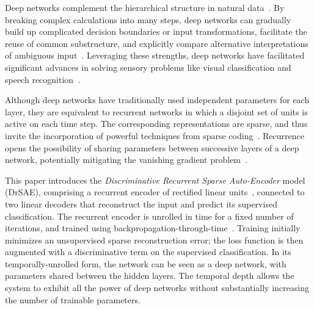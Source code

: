 \documentclass{article} %
\begin{document}
Deep networks complement the hierarchical structure in natural data~\citep{bengio2009}.  
By breaking complex calculations into many steps, deep networks can gradually build up complicated decision boundaries or input transformations, facilitate the reuse of common substructure, and explicitly compare alternative interpretations of ambiguous input~\citep{lee2008, zeiler2011}.  
Leveraging these strengths, deep networks have facilitated significant advances in solving sensory problems like visual classification and speech recognition~\citep{hinton2006, dahl2012, hinton2012}.  

Although deep networks have traditionally used independent parameters for each layer, they are equivalent to recurrent networks in which a disjoint set of units is active on each time step.  
The corresponding representations are sparse, and thus invite the incorporation of powerful techniques from sparse coding~\citep{olshausen1996, olshausen1997, ranzato2006, lee2008, glorot2011}.
Recurrence opens the possibility of sharing parameters between successive layers of a deep network, potentially mitigating the vanishing gradient problem~\citep{bengio1994}.

This paper introduces the \emph{Discriminative Recurrent Sparse Auto-Encoder} model (DrSAE), comprising a recurrent encoder of rectified linear units~\citep[ReLU; ][]{salinas1996, jarrett2009, nair2010, glorot2011}, connected to two linear decoders that reconstruct the input and predict its supervised classification.  The recurrent encoder is unrolled in time for a fixed number of iterations, and trained using backpropagation-through-time~\citep{rumelhart1986}.  Training initially minimizes an unsupervised sparse reconstruction error; the loss function is then augmented with a discriminative term on the supervised classification.  
In its temporally-unrolled form, the network can be seen as a deep network, with parameters shared between the hidden layers. The temporal depth allows the system to exhibit all the power of deep networks without substantially increasing the number of trainable parameters. 
\end{document}
